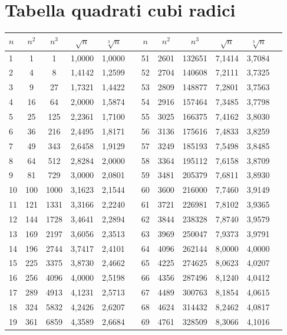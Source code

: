 
\section{Tabella quadrati cubi radici}
\label{sec:Tabellaquadraticubiradici}
\begin{longtable}{p{.17\linewidth}*{11}{S}} 
	\toprule
	\bfseries {$n$} &  {$n^2$} & {$n^3$}&{$\sqrt{n}$}&{$\sqrt[3]{n}$}&{ }&{$n$} &  {$n^2$} & {$n^3$}&{$\sqrt{n}$}&{$\sqrt[3]{n}$}  \\
	\midrule \endhead
	\bottomrule \endfoot{}
1&1&1&1,0000&1,0000&&51&2601&132651&7,1414&3,7084\\
2&4&8&1,4142&1,2599&&52&2704&140608&7,2111&3,7325\\
3&9&27&1,7321&1,4422&&53&2809&148877&7,2801&3,7563\\
4&16&64&2,0000&1,5874&&54&2916&157464&7,3485&3,7798\\
5&25&125&2,2361&1,7100&&55&3025&166375&7,4162&3,8030\\
6&36&216&2,4495&1,8171&&56&3136&175616&7,4833&3,8259\\
7&49&343&2,6458&1,9129&&57&3249&185193&7,5498&3,8485\\
8&64&512&2,8284&2,0000&&58&3364&195112&7,6158&3,8709\\
9&81&729&3,0000&2,0801&&59&3481&205379&7,6811&3,8930\\
10&100&1000&3,1623&2,1544&&60&3600&216000&7,7460&3,9149\\
11&121&1331&3,3166&2,2240&&61&3721&226981&7,8102&3,9365\\
12&144&1728&3,4641&2,2894&&62&3844&238328&7,8740&3,9579\\
13&169&2197&3,6056&2,3513&&63&3969&250047&7,9373&3,9791\\
14&196&2744&3,7417&2,4101&&64&4096&262144&8,0000&4,0000\\
15&225&3375&3,8730&2,4662&&65&4225&274625&8,0623&4,0207\\
16&256&4096&4,0000&2,5198&&66&4356&287496&8,1240&4,0412\\
17&289&4913&4,1231&2,5713&&67&4489&300763&8,1854&4,0615\\
18&324&5832&4,2426&2,6207&&68&4624&314432&8,2462&4,0817\\
19&361&6859&4,3589&2,6684&&69&4761&328509&8,3066&4,1016\\

\end{longtable}
